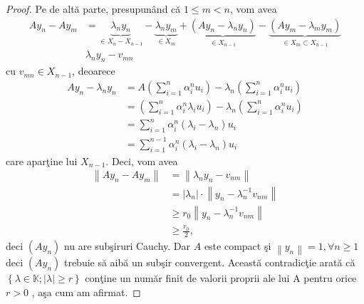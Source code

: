 \documentclass[a4paper,12pt,oneside]{report}
\begin{document}
\begin{proof}
Pe de alt\u{a} parte, presupun\^{a}nd c\u{a} \(1\leq m< n\), vom avea
\begin{equation} \nonumber
    \begin{split}
        Ay_{n} - Ay_{m}  & = \underbrace{\lambda _{n}y_{n}}_{\in X_{n}-X_{n-1}} - \underbrace{\lambda _{n}y_{m}}_{\in X_{m}}+\underbrace{\left ( Ay_{n} - \lambda _{n}y_{n}\right )}_{\in X_{n-1}} - \underbrace{\left ( Ay_{m}  - \lambda _{m}y_{m}\right )}_{\in X_{m}\subset X_{n-1}} \\ & \lambda _{n}y_{n} - v_{mn}
    \end{split}
\end{equation}
cu \(v_{mn} \in X_{n-1}\), deoarece
\begin{equation} \nonumber
    \begin{split}
        Ay_{n} - \lambda _{n}y_{n}  & = A \left ( \sum_{i =1 }^{n} \alpha _{i}^{n}u_{i} \right ) - \lambda _{n}\left ( \sum_{i = 1}^{n} \alpha _{i}^{n}u_{i} \right ) \\ & = \left ( \sum_{i =1 }^{n} \alpha _{i}^{n}\lambda _{i}u_{i} \right ) - \lambda _{n}\left ( \sum_{i = 1}^{n} \alpha _{i}^{n}u_{i} \right ) \\ & = \sum_{i =1 }^{n} \alpha _{i}^{n}\left ( \lambda _{i} - \lambda _{n} \right )u_{i} \\ & = \sum_{i =1 }^{n-1} \alpha _{i}^{n}\left ( \lambda _{i} - \lambda _{n} \right )u_{i}
    \end{split}
\end{equation}
care apar\c{t}ine lui \(X_{n-1}\). Deci, vom avea
\begin{equation} \nonumber
    \begin{split}
        \left \| Ay_{n} - Ay_{m} \right \| & = \left \| \lambda_{n}y_{n} - v_{nm} \right \| \\ & = \left | \lambda _{n} \right |\cdot \left \| y_{n} - \lambda _{n}^{-1}v_{nm} \right \| \\ & \geq  r_{0} \left \| y_{n}- \lambda _{n}^{-1}v_{nm} \right \| \\ & \geq  \frac{r_{0}}{2},
    \end{split}
\end{equation}
deci \(\left ( Ay_{n} \right )\) nu are sub\c{s}iruri Cauchy. Dar \(A\) este compact \c{s}i \(\left \| y_{n} \right \| = 1, \forall n\geq 1\) deci \(\left ( Ay_{n} \right )\) trebuie s\u{a} aib\u{a} un sub\c{s}ir convergent. Aceast\u{a} contradic\c{t}ie arat\u{a} c\u{a} \(\left \{ \lambda \in \mathbb{K}; \left | \lambda  \right | \geq  r \right \}\) con\c{t}ine un num\u{a}r finit de valorii proprii ale lui A pentru orice \(r > 0\) , a\c{s}a cum am afirmat.
\end{proof}
\end{document}
